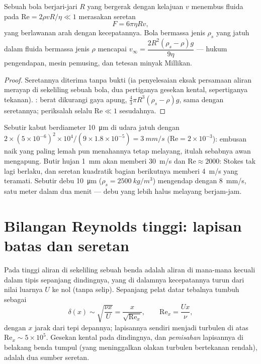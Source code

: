\begin{proposition}\label{prop:b2:viscous-flows:stokes}
Sebuah bola berjari-jari $R$ yang bergerak dengan kelajuan $v$ menembus fluida pada
$\mathrm{Re} = 2\rho vR/\eta \ll 1$ merasakan seretan
\[
F = 6\pi\eta Rv ,
\]
yang berlawanan arah dengan kecepatannya. Bola bermassa jenis $\rho_s$ yang jatuh dalam fluida
bermassa jenis $\rho$ mencapai \emph{} $v_\infty =
\dfrac{2R^2(\rho_s - \rho)g}{9\eta}$ --- hukum pengendapan,
mesin pemusing, dan tetesan minyak Millikan.
\end{proposition}

\begin{proof}
Seretannya diterima tanpa bukti (ia penyelesaian eksak persamaan aliran
merayap di sekeliling sebuah bola, dua pertiganya gesekan kental, sepertiganya
tekanan). : berat dikurangi gaya apung, $\tfrac43\pi R^3(\rho_s -
\rho)g$, sama dengan seretannya; periksalah selalu $\mathrm{Re} \ll 1$ sesudahnya.
\end{proof}

\begin{example}\label{ex:b2:viscous-flows:fog}
Sebutir kabut berdiameter \qty{10}{\micro m} di udara jatuh dengan $2 \times (5 \times
10^{-6})^2 \times 10^4/(9 \times 1.8 \times 10^{-5}) = \qty{3}{mm/s}$ ($\mathrm{Re} = 2 \times
10^{-3}$): embusan naik yang paling lemah pun menahannya tetap melayang, itulah sebabnya awan
mengapung. Butir hujan \qty{1}{mm} akan memberi \qty{30}{m/s} dan $\mathrm{Re} \approx 2000$:
Stokes tak lagi berlaku, dan seretan kuadratik bagian berikutnya
memberi \qty{4}{m/s} yang teramati. Sebutir debu \qty{10}{\micro m} ($\rho_s =
\qty{2500}{kg/m^3}$) mengendap dengan \qty{8}{mm/s}, satu meter dalam dua menit ---
debu yang lebih halus melayang berjam-jam.
\end{example}

\section{Bilangan Reynolds tinggi: lapisan batas dan seretan}

\begin{proposition}\label{prop:b2:viscous-flows:bl}
Pada  tinggi aliran di sekeliling sebuah benda adalah
aliran  di mana-mana kecuali dalam \emph{} tipis
sepanjang dindingnya, yang di dalamnya kecepatannya turun dari nilai luarnya $U$ ke nol (tanpa selip).
Sepanjang pelat datar tebalnya tumbuh sebagai
\[
\delta(x) \sim \sqrt{\frac{\nu x}{U}} = \frac{x}{\sqrt{\mathrm{Re}_x}} ,
\qquad \mathrm{Re}_x = \frac{Ux}{\nu} ,
\]
dengan $x$ jarak dari tepi depannya; lapisannya sendiri menjadi
turbulen di atas $\mathrm{Re}_x \sim 5 \times 10^5$. Gesekan kental pada
dindingnya, dan \emph{pemisahan} lapisannya di belakang benda tumpul (yang
meninggalkan olakan turbulen bertekanan rendah), adalah dua sumber seretan.
\end{proposition}

